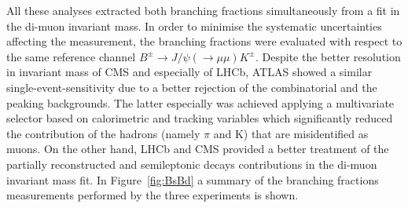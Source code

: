 All these analyses extracted both branching fractions simultaneously from a fit in the di-muon invariant mass. In order to minimise the systematic uncertainties affecting the measurement, the branching fractions were evaluated with respect to the same reference channel $B^{\pm} \to J/\psi(\to \mu \mu) K^{\pm}$. Despite the better resolution in invariant mass of CMS and especially of LHCb, ATLAS showed a similar single-event-sensitivity due to a better rejection of the combinatorial and the peaking backgrounds. The latter especially was achieved applying a  multivariate selector based on calorimetric and tracking variables which significantly reduced the contribution of the hadrons (namely $\pi$ and K) that are misidentified as muons. On the other hand, LHCb and CMS provided a better treatment of the partially reconstructed and semileptonic decays contributions in the di-muon invariant mass fit.
In Figure~\ref{fig:BsBd} a summary of the branching fractions measurements performed by the three experiments is shown.

